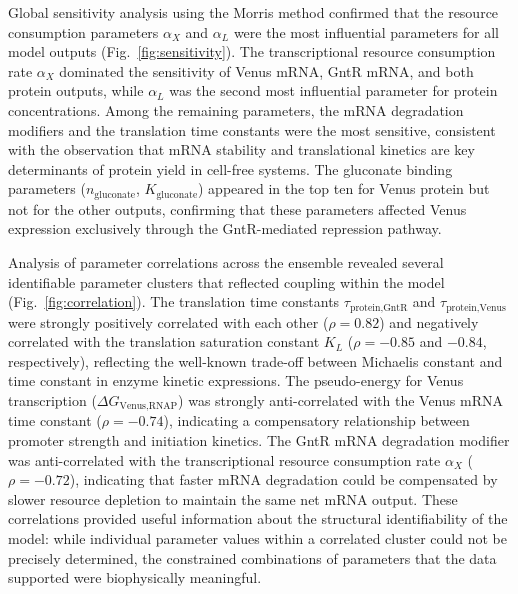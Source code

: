 \documentclass[12pt]{article}
\begin{document}
Global sensitivity analysis using the Morris method confirmed that the resource consumption parameters $\alpha_X$ and $\alpha_L$ were the most influential parameters for all model outputs (Fig.~\ref{fig:sensitivity}). The transcriptional resource consumption rate $\alpha_X$ dominated the sensitivity of Venus mRNA, GntR mRNA, and both protein outputs, while $\alpha_L$ was the second most influential parameter for protein concentrations. Among the remaining parameters, the mRNA degradation modifiers and the translation time constants were the most sensitive, consistent with the observation that mRNA stability and translational kinetics are key determinants of protein yield in cell-free systems. The gluconate binding parameters ($n_{\text{gluconate}}$, $K_{\text{gluconate}}$) appeared in the top ten for Venus protein but not for the other outputs, confirming that these parameters affected Venus expression exclusively through the GntR-mediated repression pathway.

Analysis of parameter correlations across the ensemble revealed several identifiable parameter clusters that reflected coupling within the model (Fig.~\ref{fig:correlation}). The translation time constants $\tau_{\text{protein,GntR}}$ and $\tau_{\text{protein,Venus}}$ were strongly positively correlated with each other ($\rho = 0.82$) and negatively correlated with the translation saturation constant $K_L$ ($\rho = -0.85$ and $-0.84$, respectively), reflecting the well-known trade-off between Michaelis constant and time constant in enzyme kinetic expressions. The pseudo-energy for Venus transcription ($\Delta G_{\text{Venus,RNAP}}$) was strongly anti-correlated with the Venus mRNA time constant ($\rho = -0.74$), indicating a compensatory relationship between promoter strength and initiation kinetics. The GntR mRNA degradation modifier was anti-correlated with the transcriptional resource consumption rate $\alpha_X$ ($\rho = -0.72$), indicating that faster mRNA degradation could be compensated by slower resource depletion to maintain the same net mRNA output. These correlations provided useful information about the structural identifiability of the model: while individual parameter values within a correlated cluster could not be precisely determined, the constrained combinations of parameters that the data supported were biophysically meaningful.
\end{document}
